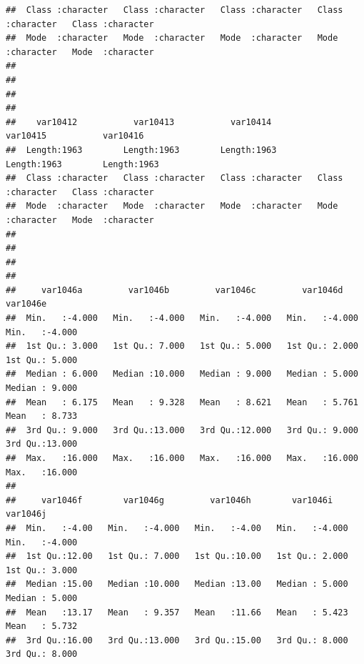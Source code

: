 \documentclass[
]{book}
\begin{document}
\begin{verbatim}
##  Class :character   Class :character   Class :character   Class :character   Class :character  
##  Mode  :character   Mode  :character   Mode  :character   Mode  :character   Mode  :character  
##                                                                                                
##                                                                                                
##                                                                                                
##                                                                                                
##    var10412           var10413           var10414           var10415           var10416        
##  Length:1963        Length:1963        Length:1963        Length:1963        Length:1963       
##  Class :character   Class :character   Class :character   Class :character   Class :character  
##  Mode  :character   Mode  :character   Mode  :character   Mode  :character   Mode  :character  
##                                                                                                
##                                                                                                
##                                                                                                
##                                                                                                
##     var1046a         var1046b         var1046c         var1046d         var1046e     
##  Min.   :-4.000   Min.   :-4.000   Min.   :-4.000   Min.   :-4.000   Min.   :-4.000  
##  1st Qu.: 3.000   1st Qu.: 7.000   1st Qu.: 5.000   1st Qu.: 2.000   1st Qu.: 5.000  
##  Median : 6.000   Median :10.000   Median : 9.000   Median : 5.000   Median : 9.000  
##  Mean   : 6.175   Mean   : 9.328   Mean   : 8.621   Mean   : 5.761   Mean   : 8.733  
##  3rd Qu.: 9.000   3rd Qu.:13.000   3rd Qu.:12.000   3rd Qu.: 9.000   3rd Qu.:13.000  
##  Max.   :16.000   Max.   :16.000   Max.   :16.000   Max.   :16.000   Max.   :16.000  
##                                                                                      
##     var1046f        var1046g         var1046h        var1046i         var1046j     
##  Min.   :-4.00   Min.   :-4.000   Min.   :-4.00   Min.   :-4.000   Min.   :-4.000  
##  1st Qu.:12.00   1st Qu.: 7.000   1st Qu.:10.00   1st Qu.: 2.000   1st Qu.: 3.000  
##  Median :15.00   Median :10.000   Median :13.00   Median : 5.000   Median : 5.000  
##  Mean   :13.17   Mean   : 9.357   Mean   :11.66   Mean   : 5.423   Mean   : 5.732  
##  3rd Qu.:16.00   3rd Qu.:13.000   3rd Qu.:15.00   3rd Qu.: 8.000   3rd Qu.: 8.000  

\end{verbatim}
\end{document}
